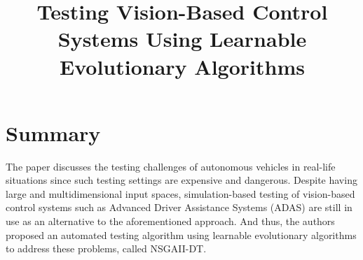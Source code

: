 \documentclass[10pt,a4paper]{report}
\title{Testing Vision-Based Control Systems Using Learnable Evolutionary Algorithms}
\begin{document}
\begin{center}
\textbf{\thetitle}
\end{center}


\section{Summary}
The paper discusses the testing challenges of autonomous vehicles in real-life situations since such testing settings are expensive and dangerous. 
%
Despite having large and multidimensional input spaces, simulation-based testing of vision-based control systems such as Advanced Driver Assistance Systems (ADAS) are still in use as an alternative to the aforementioned approach.
%
And thus, the authors proposed an automated testing algorithm using learnable evolutionary algorithms to address these problems, called NSGAII-DT.
%
\end{document}
